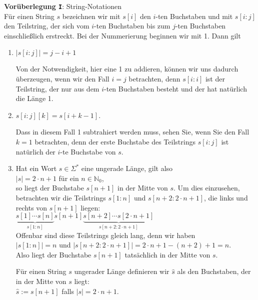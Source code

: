 \noindent
\textbf{Vor\"uberlegung \texttt{I}}: String-Notationen \\
F\"ur einen String $s$ bezeichnen wir mit $s[i]$ den $i$-ten Buchstaben und mit
$s[i\!:\!j]$ den Teilstring, der sich vom $i$-ten Buchstaben bis zum $j$-ten Buchstaben einschlie{\ss}lich
erstreckt.  Bei der Nummerierung beginnen wir mit 1.
Dann gilt
\begin{enumerate}
\item $|s[i\!:\!j]| = j - i + 1$

      Von der Notwendigkeit, hier eine 1 zu addieren, k\"onnen wir uns dadurch \"uberzeugen, wenn wir den
      Fall $i = j$ betrachten, denn $s[i\!:\!i]$ ist der Teilstring, der nur aus dem $i$-ten
      Buchstaben besteht und der hat nat\"urlich die L\"ange 1.
\item $s[i\!:\!j][k] = s[i + k - 1]$.

      Dass in diesem Fall 1 subtrahiert werden muss, sehen Sie, wenn Sie den Fall $k=1$ betrachten,
      denn der erste Buchstabe des Teilstrings $s[i\!:\!j]$ ist nat\"urlich der $i$-te
      Buchstabe von $s$.
\item Hat ein Wort $s \in \Sigma^*$ eine ungerade L\"ange, gilt also
      \\[0.2cm]
      \hspace*{1.3cm}
      $|s| = 2 \cdot n +1$ \quad f\"ur ein $n \in \mathbb{N}_0$,
      \\[0.2cm]
      so liegt der Buchstabe $s[n + 1]$ in der Mitte von $s$.  Um dies einzusehen,
      betrachten wir die Teilstrings $s[1:n]$ und $s[n+2:2\cdot n+1]$, die links und rechts
      von $s[n+1]$ liegen:
      \\[0.2cm]
      \hspace*{1.3cm}
      $\underbrace{s[1] \cdots s[n]}_{s[1:n]} s[n+1] \underbrace{s[n+2] \cdots s[2 \cdot n
        +1]}_{s[n+2:2\cdot n+1]}$
      \\[0.2cm]
      Offenbar sind diese Teilstrings gleich lang, denn wir haben
      \\[0.2cm]
      \hspace*{1.3cm}
      $|s[1:n]| = n$ \quad und \quad $|s[n+2:2\cdot n+1]| = 2 \cdot n + 1 - (n+2) + 1 = n$.
      \\[0.2cm]
      Also liegt der Buchstabe $s[n+1]$ tats\"achlich in der Mitte von $s$.  

      F\"ur einen String $s$ ungerader L\"ange definieren wir $\hat{s}$ als den Buchstaben,
      der in der Mitte von $s$ liegt:
      \\[0.2cm]
      \hspace*{1.3cm}
      $\hat{s} := s[n+1]$ \quad falls $|s| = 2 \cdot n + 1$.
\end{enumerate}

